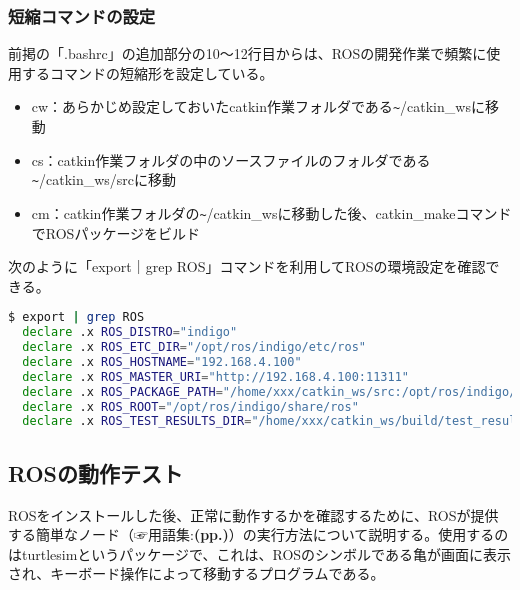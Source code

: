 \subsubsection{短縮コマンドの設定}

前掲の「.bashrc」の追加部分の10～12行目からは、ROSの開発作業で頻繁に使用するコマンドの短縮形を設定している。

\begin{itemize}[leftmargin=*]
\item cw：あらかじめ設定しておいたcatkin作業フォルダである\verb|~|/catkin\_wsに移動
\item cs：catkin作業フォルダの中のソースファイルのフォルダである\verb|~|/catkin\_ws/srcに移動
\item cm：catkin作業フォルダの\verb|~|/catkin\_wsに移動した後、catkin\_makeコマンドでROSパッケージをビルド
\end{itemize}

\begin{exercise}[ROSの環境設定を確認する方法]
  次のように「export｜grep ROS」コマンドを利用してROSの環境設定を確認できる。

  \begin{lstlisting}[language=bash]
  $ export | grep ROS
  declare .x ROS_DISTRO="indigo"
  declare .x ROS_ETC_DIR="/opt/ros/indigo/etc/ros"
  declare .x ROS_HOSTNAME="192.168.4.100"
  declare .x ROS_MASTER_URI="http://192.168.4.100:11311"
  declare .x ROS_PACKAGE_PATH="/home/xxx/catkin_ws/src:/opt/ros/indigo/share:/opt/ros/indigo/ stacks"
  declare .x ROS_ROOT="/opt/ros/indigo/share/ros"
  declare .x ROS_TEST_RESULTS_DIR="/home/xxx/catkin_ws/build/test_results"
  \end{lstlisting}
\end{exercise}


\subsection{ROSの動作テスト}
\label{section:turtlesimtest}

ROSをインストールした後、正常に動作するかを確認するために、ROSが提供する簡単なノード（☞用語集:\textbf{(pp.\pageref{section:terms})}）の実行方法について説明する。使用するのはturtlesimというパッケージで、これは、ROSのシンボルである亀が画面に表示され、キーボード操作によって移動するプログラムである。

